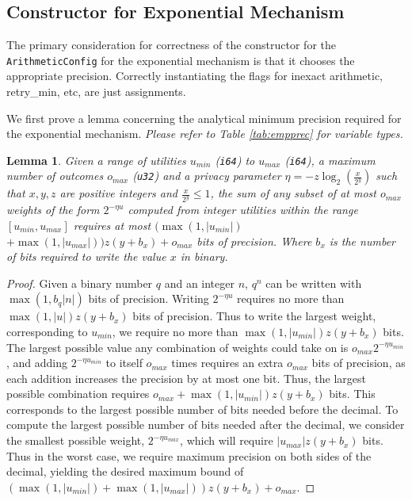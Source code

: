 \documentclass[11pt]{article}
\newtheorem{lemma}[theorem]{Lemma}
\theoremstyle{definition}
\newcommand{\unsigned}[1]{{\tt u#1}}
\newcommand{\signed}[1]{{\tt i#1}}
\begin{document}
\subsection{Constructor for Exponential Mechanism}

The primary consideration for correctness of the constructor for the \texttt{ArithmeticConfig} for the exponential mechanism is that it chooses the appropriate precision. Correctly instantiating the flags for inexact arithmetic, retry\_min, etc, are just assignments. 

We first prove a lemma concerning the analytical minimum precision required for the exponential mechanism. \textit{Please refer to Table \ref{tab:empprec} for variable types.}

\begin{lemma}\label{lemma:minprec}
Given a range of utilities $u_{min}$ (\signed{64}) to $u_{max}$ (\signed{64}), a maximum number of outcomes $o_{max}$ (\unsigned{32}) and a privacy parameter $\eta = -z\log_2(\frac{x}{2^y})$ such that $x,y,z$ are positive integers and $\frac{x}{2^y}\leq 1$, the sum of any subset of at most $o_{max}$ weights of the form $2^{-\eta u}$ computed from integer utilities within the range $[u_{min}, u_{max}]$ requires at most $(\max(1,|u_{min}|) $ $+ \max(1,|u_{max}|))z(y + b_x) + o_{max}$ bits of precision. Where $b_x$ is the number of bits required to write the value $x$ in binary.
\end{lemma}

\begin{proof}
Given a binary number $q$ and an integer $n$, $q^n$ can be written with $\max(1,b_q |n|)$ bits of precision.  
Writing $2^{-\eta u}$ requires no more than $\max(1,|u|)z(y + b_x)$ bits of precision. Thus to write the largest weight, corresponding to $u_{min}$, we require no more than $\max(1,|u_{min}|)z(y + b_x)$ bits. The largest possible value any combination of weights could take on is $o_{max} 2^{-\eta u_{min}}$, and adding $2^{-\eta u_{min}}$ to itself $o_{max}$ times requires an extra $o_{max}$ bits of precision, as each addition increases the precision by at most one bit. Thus, the largest possible combination requires $o_{max} + \max(1,|u_{min}|)z(y + b_x)$ bits. This corresponds to the largest possible number of bits needed before the decimal. To compute the largest possible number of bits needed after the decimal, we consider the smallest possible weight, $2^{-\eta u_{max}}$, which will require $|u_{max}|z(y + b_x)$ bits. Thus in the worst case, we require maximum precision on both sides of the decimal, yielding the desired maximum bound of $(\max(1,|u_{min}|) + \max(1,|u_{max}|))z(y + b_x) + o_{max}$.
\end{proof}
\end{document}
